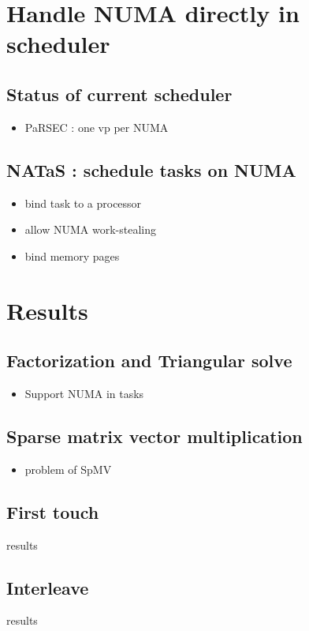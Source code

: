 \documentclass[oneside,12t]{classes/Thesis}
\begin{document}
\section{Handle NUMA directly in scheduler}
\subsection{Status of current scheduler}
  \begin{itemize}
    \item PaRSEC : one vp per NUMA
  \end{itemize}
\subsection{NATaS : schedule tasks on NUMA}
  \begin{itemize}
    \item bind task to a processor
    \item allow NUMA work-stealing
    \item bind memory pages
  \end{itemize}


\section{Results}
\subsection{Factorization and Triangular solve}
  \begin{itemize}
    \item Support NUMA in tasks
  \end{itemize}
\subsection{Sparse matrix vector multiplication}
  \begin{itemize}
    \item problem of SpMV
  \end{itemize}
\subsection{First touch}
results
\subsection{Interleave}
results
\end{document}
